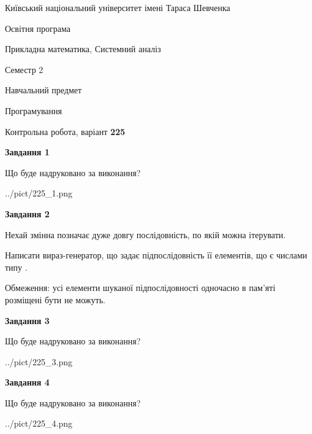 \documentclass[12pt, ukrainian]{article}
\begin{document}
{{\begin {small}\par
{ \center  Київський національний університет імені Тараса Шевченка \par}
{\parbox {5 cm}{Освітня програма \hfill}{\parbox {8 cm}{Прикладна математика, Системний аналіз \hfill}}\parbox {5 cm}{\hfill Семестр 2}}\par
{\parbox {5 cm} {Навчальний предмет \hfill}\parbox {7 cm}{Програмування \hfill}\parbox {6cm}{\hfill}\par}\vspace{-7pt} \end{small}}{\center Контрольна робота, варіант  \No \textbf
{ 225 }\par}}
{
\begin {large}
{\begin {center}\textbf{Завдання 1}\end {center}}\par
Що буде надруковано за виконання?\par\par
\begin{center}
	{../pict/225_1.png}
\end{center}
\newpage

{\begin {center}\textbf{Завдання 2}\end {center}}\par
Нехай змінна  позначає дуже довгу послідовність, по якій можна ітерувати.

Написати вираз-генератор, що задає підпослідовність її елементів, що є числами типу .

Обмеження: усі елементи шуканої підпослідовності одночасно в пам'яті розміщені бути не можуть.\par
\newpage

{\begin {center}\textbf{Завдання 3}\end {center}}\par
Що буде надруковано за виконання?
\begin{center}
	{../pict/225_3.png}
\end{center}
\newpage

{\begin {center}\textbf{Завдання 4}\end {center}}\par
Що буде надруковано за виконання?\par
\begin{center}
	{../pict/225_4.png}
\end{center}
\newpage


\end{large}}
\end{document}
